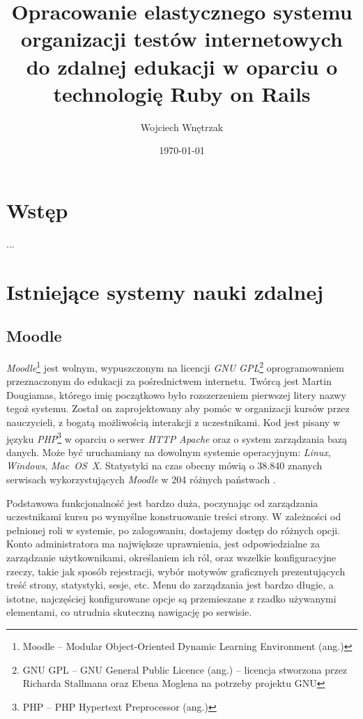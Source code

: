 \documentclass[a4paper,12pt]{article}
\begin{document}
\author{Wojciech Wnętrzak}
\title{Opracowanie elastycznego systemu organizacji testów internetowych do zdalnej
edukacji w oparciu o technologię Ruby on Rails}
\date{\today}

\begin{titlepage}
\maketitle
\end{titlepage}

\tableofcontents

\clearpage
\section{Wstęp}
...

\section{Istniejące systemy nauki zdalnej}
\subsection{Moodle}
\emph{Moodle}\footnote{Moodle -- Modular Object-Oriented Dynamic Learning Environment (ang.)}
jest wolnym, wypuszczonym na licencji \emph{GNU GPL}\footnote{GNU GPL -- GNU General Public
Licence (ang.) -- licencja stworzona przez Richarda Stallmana oraz Ebena Moglena na potrzeby
projektu GNU} oprogramowaniem przeznaczonym do edukacji za pośrednictwem internetu. Twórcą
jest Martin Dougiamas, którego imię początkowo było rozszerzeniem pierwszej litery nazwy
tegoż systemu. Został on zaprojektowany aby pomóc w organizacji kursów przez nauczycieli,
z bogatą możliwością interakcji z uczestnikami. Kod jest pisany w języku
\emph{PHP}\footnote{PHP -- PHP Hypertext Preprocessor (ang.)} w oparciu o serwer \emph{HTTP}
\emph{Apache} oraz o system zarządzania bazą danych. Może być uruchamiany na dowolnym
systemie operacyjnym: \emph{Linux}, \emph{Windows}, \emph{Mac~OS~X}. Statystyki na czas
obecny mówią o 38.840 znanych serwisach wykorzystujących \emph{Moodle} w 204 różnych
państwach \cite{moodle-statistics}.


Podstawowa funkcjonalność jest bardzo duża, poczynając od zarządzania uczestnikami kursu
po wymyślne konstruowanie treści strony. W zależności od pełnionej roli w systemie, po
zalogowaniu, dostajemy dostęp do różnych opcji. Konto administratora ma największe
uprawnienia, jest odpowiedzialne za zarządzanie użytkownikami, określaniem ich ról, oraz
wszelkie konfiguracyjne rzeczy, takie jak sposób rejestracji, wybór motywów graficznych
prezentujących treść strony, statystyki, sesje, etc.
Menu do zarządzania jest bardzo długie, a istotne, najczęściej konfigurowane opcje są
przemieszane z rzadko używanymi elementami, co utrudnia skuteczną nawigację po serwisie.
\end{document}

